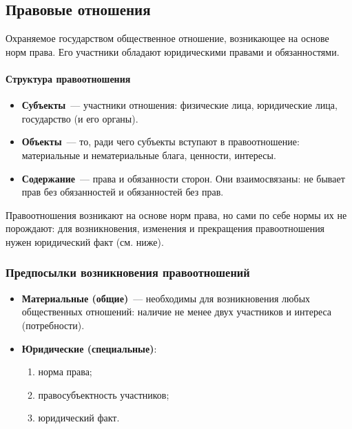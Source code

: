 \documentclass[12pt]{article}
\begin{document}
	\subsection{Правовые отношения}
	
	\begin{definition}[Правоотношение]
		Охраняемое государством общественное отношение, возникающее на основе норм права. Его участники обладают юридическими правами и обязанностями.
	\end{definition}
	
	\paragraph{Структура правоотношения}
	
	\begin{itemize}
		\item \textbf{Субъекты}~--- участники отношения: физические лица, юридические лица, государство (и его органы).
		\item \textbf{Объекты}~--- то, ради чего субъекты вступают в правоотношение: материальные и нематериальные блага, ценности, интересы.
		\item \textbf{Содержание}~--- права и обязанности сторон. Они взаимосвязаны: не бывает прав без обязанностей и обязанностей без прав.
	\end{itemize}
	
	\begin{note}
		Правоотношения возникают на основе норм права, но сами по себе нормы их не порождают: для возникновения, изменения и прекращения правоотношения нужен юридический факт (см. ниже).
	\end{note}
	
	\subsubsection{Предпосылки возникновения правоотношений}
	
	\begin{itemize}
		\item \textbf{Материальные (общие)}~--- необходимы для возникновения любых общественных отношений: наличие не менее двух участников и интереса (потребности).
		\item \textbf{Юридические (специальные)}:
		\begin{enumerate}
			\item норма права;
			\item правосубъектность участников;
			\item юридический факт.
		\end{enumerate}
	\end{itemize}
	
\end{document}
